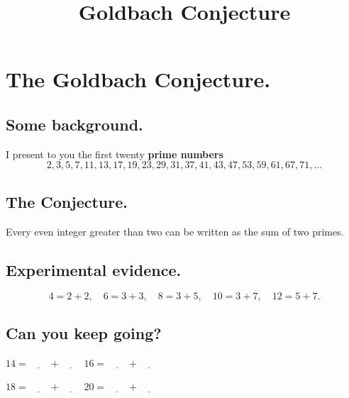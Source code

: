 \documentclass[12pt]{article}
\title{Goldbach Conjecture}
\begin{document}
\Large

\section*{The Goldbach Conjecture.}

\subsection*{Some background.}

I present to you the first twenty \textbf{prime numbers}
$$
2, 3, 5, 7, 11,
13, 17, 19, 23, 29,
31, 37, 41, 43, 47,
53, 59, 61, 67, 71, \ldots
$$

\subsection*{The Conjecture.}

Every even integer greater than two can be written as the sum of two primes.

\subsection*{Experimental evidence.}

$$
4 = 2 + 2, \hspace{1em}
6 = 3 + 3, \hspace{1em}
8 = 3 + 5, \hspace{1em}
10 = 3 + 7, \hspace{1em}
12 = 5 + 7.
$$

\subsection*{Can you keep going?}

\noindent $14 = \underline{\hspace{2em}} + \underline{\hspace{2em}}$
\hfill $16 = \underline{\hspace{2em}} + \underline{\hspace{2em}}$ \hfill\null
\vspace{3ex}

\noindent $18 = \underline{\hspace{2em}} + \underline{\hspace{2em}}$
\hfill $20 = \underline{\hspace{2em}} + \underline{\hspace{2em}}$ \hfill\null
\vspace{3ex}
\end{document}
